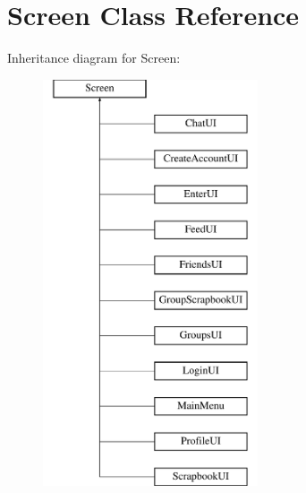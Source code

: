 \hypertarget{classScreen}{}\section{Screen Class Reference}
\label{classScreen}
Inheritance diagram for Screen\+:\begin{figure}[H]
\begin{center}
\leavevmode
\includegraphics[height=12.000000cm]{classScreen}
\end{center}
\end{figure}
